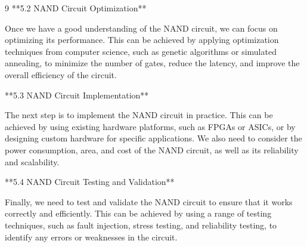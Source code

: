 \documentclass[11pt]{article}
\theoremstyle{definition}
\begin{document}
\begin{thebibliography}{9}
**5.2 NAND Circuit Optimization**













Once we have a good understanding of the NAND circuit, we can focus on optimizing its performance. This can be achieved by applying optimization techniques from computer science, such as genetic algorithms or simulated annealing, to minimize the number of gates, reduce the latency, and improve the overall efficiency of the circuit.













**5.3 NAND Circuit Implementation**













The next step is to implement the NAND circuit in practice. This can be achieved by using existing hardware platforms, such as FPGAs or ASICs, or by designing custom hardware for specific applications. We also need to consider the power consumption, area, and cost of the NAND circuit, as well as its reliability and scalability.













**5.4 NAND Circuit Testing and Validation**













Finally, we need to test and validate the NAND circuit to ensure that it works correctly and efficiently. This can be achieved by using a range of testing techniques, such as fault injection, stress testing, and reliability testing, to identify any errors or weaknesses in the circuit.














\end{thebibliography}
\end{document}
